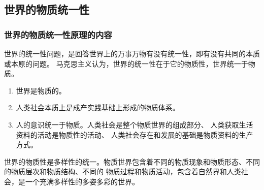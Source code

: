 \documentclass[11pt, UTF8]{book} %
\begin{document}
\subsection{世界的物质统一性}

\subsubsection{世界的物质统一性原理的内容}

世界的统一性问题，是回答世界上的万事万物有没有统一性，即有没有共同的本质或本原的问题。
马克思主义认为，世界的统一性在于它的物质性，世界统一于物质。
\begin{enumerate}[label={${\arabic*}^\circ$}, itemsep=0pt]
    \item {\kaishu 世界是物质的。}
    \item {\kaishu 人类社会本质上是成产实践基础上形成的物质体系。}
    \item {\kaishu 人的意识统一于物质。}人类社会是整个物质世界的组成部分、
    人类获取生活资料的活动是物质性的活动、
    人类社会存在和发展的基础是物质资料的生产方式。
\end{enumerate}
世界的物质性是多样性的统一。物质世界包含着不同的物质现象和物质形态、不同的物质层次和物质结构、不同的
物质过程和物质活动，包含着自然界和人类社会，是一个充满多样性的多姿多彩的世界。

    
\end{document}
